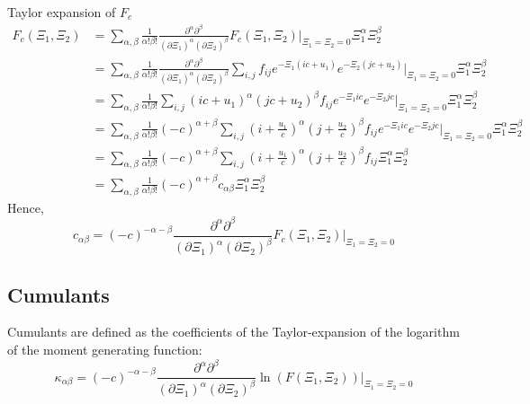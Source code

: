 \documentclass{article}
\begin{document}
Taylor expansion of $F_c$
\begin{equation}
  \label{eq: taylor of Fc}
  \begin{aligned}
    F_c(\Xi_1, \Xi_2) & = \sum_{\alpha,\beta} \frac{1}{\alpha!\beta!} \frac{\partial^\alpha\partial^\beta}{{(\partial \Xi_1)}^\alpha{(\partial \Xi_2)}^\beta} F_c(\Xi_1, \Xi_2)\Bigr|_{\Xi_1=\Xi_2 = 0} \Xi_1^\alpha \Xi_2^\beta \\
    & = \sum_{\alpha,\beta} \frac{1}{\alpha!\beta!}
      \frac{\partial^\alpha\partial^\beta}{{(\partial \Xi_1)}^\alpha{(\partial \Xi_2)}^\beta} \sum_{i,j}f_{ij} e^{-\Xi_1 (ic+u_1)} e^{-\Xi_2 (jc+u_2)} \Bigr|_{\Xi_1=\Xi_2 = 0} \Xi_1^\alpha \Xi_2^\beta \\
    & = \sum_{\alpha,\beta} \frac{1}{\alpha!\beta!} \sum_{i,j} {(ic+u_1)}^\alpha {(jc+u_2)}^\beta f_{ij} e^{-\Xi_1 ic} e^{-\Xi_2 jc} \Bigr|_{\Xi_1=\Xi_2 = 0} \Xi_1^\alpha \Xi_2^\beta \\
    & = \sum_{\alpha,\beta} \frac{1}{\alpha!\beta!} {(-c)}^{\alpha+\beta}
      \sum_{i,j} {\left(i+\frac{u_1}{c}\right)}^\alpha {\left(j+\frac{u_2}{c}\right)}^\beta f_{ij} e^{-\Xi_1 ic} e^{-\Xi_2 jc} \Bigr|_{\Xi_1=\Xi_2 = 0} \Xi_1^\alpha \Xi_2^\beta \\
    & = \sum_{\alpha,\beta} \frac{1}{\alpha!\beta!} {(-c)}^{\alpha+\beta}
      \sum_{i,j} {\left(i+\frac{u_1}{c}\right)}^\alpha {\left(j+\frac{u_2}{c}\right)}^\beta f_{ij} \Xi_1^\alpha \Xi_2^\beta \\
    & = \sum_{\alpha,\beta} \frac{1}{\alpha!\beta!} {(-c)}^{\alpha+\beta}  c_{\alpha\beta} \Xi_1^\alpha \Xi_2^\beta
  \end{aligned}
\end{equation}
%
Hence,
\begin{equation}
  \label{eq:alternative representation of central moments}
  c_{\alpha\beta} = {(-c)}^{-\alpha-\beta} \frac{\partial^\alpha\partial^\beta}{{(\partial \Xi_1)}^\alpha{(\partial \Xi_2)}^\beta} F_c(\Xi_1, \Xi_2)\Bigr|_{\Xi_1=\Xi_2 = 0}
\end{equation}


\subsection{Cumulants}
\label{sub:Cumulants}

Cumulants are defined as the coefficients of the Taylor-expansion of the logarithm of the moment generating function:
\begin{equation}
  \label{eq:Definition of cumulants}
  \kappa_{\alpha\beta} = {(-c)}^{-\alpha-\beta} \frac{\partial^\alpha\partial^\beta}{{(\partial \Xi_1)}^\alpha{(\partial \Xi_2)}^\beta} \ln(F(\Xi_1, \Xi_2))\Bigr|_{\Xi_1=\Xi_2 = 0}
\end{equation}
\end{document}
